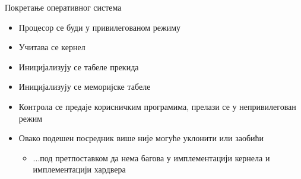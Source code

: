 \documentclass{beamer}
\begin{document}
    \begin{frame}{Покретање оперативног система}
        \begin{itemize}
            \item Процесор се буди у привилегованом режиму
            \item Учитава се кернел
            \item Иницијализују се табеле прекида
            \item Иницијализују се меморијске табеле
            \item Контрола се предаје корисничким програмима, прелази се у непривилегован режим
            \item Овако подешен посредник више није могуће уклонити или заобићи
            \begin{itemize}
                \item ...под претпоставком да нема багова у имплементацији кернела и имплементацији хардвера
            \end{itemize}
        \end{itemize}
    \end{frame}
\end{document}
